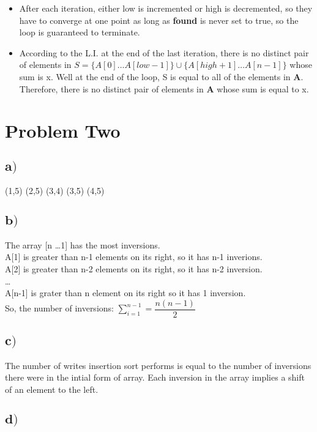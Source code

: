 \documentclass[a4paper,12pt]{article}
\begin{document}
\begin{indentpar}{1cm}
  \begin{itemize}
    \item After each iteration, either low is incremented or high is decremented, so they have to converge at one
      point as long as {\bf found} is never set to true, so the loop is guaranteed to terminate.
    \item According to the L.I. at the end of the last iteration, there is no distinct pair of elements in 
      \(S = \{A[0] \dots A[low-1] \} \cup \{A[high+1] \dots A[n-1]\}\) whose sum is x. Well at the end of the loop,
      S is equal to all of the elements in {\bf A}. Therefore, there is no distinct pair of elements in {\bf A} whose
      sum is equal to x.
  \end{itemize}
\end{indentpar}

\section{Problem Two}
\subsection{\(\mathbf a)\)}
(1,5) (2,5) (3,4) (3,5) (4,5)
\subsection{\(\mathbf b)\)}
The array [n \dots 1] has the most inversions.\\
A[1] is greater than n-1 elements on its right, so it has n-1 inverions.\\
A[2] is greater than n-2 elements on its right, so it has n-2 inversion.\\
\dots\\
A[n-1] is grater than n element on its right so it has 1 inversion.\\
So, the number of inversions: \(\sum_{i=1}^{n-1} = \dfrac{n(n-1)}{2} \) 
\subsection{\(\mathbf c)\)}
The number of writes insertion sort performs is equal to the number of inversions there were in the intial
form of array. Each inversion in the array implies a shift of an element to the left.
\subsection{\(\mathbf d)\)}
\end{document}
